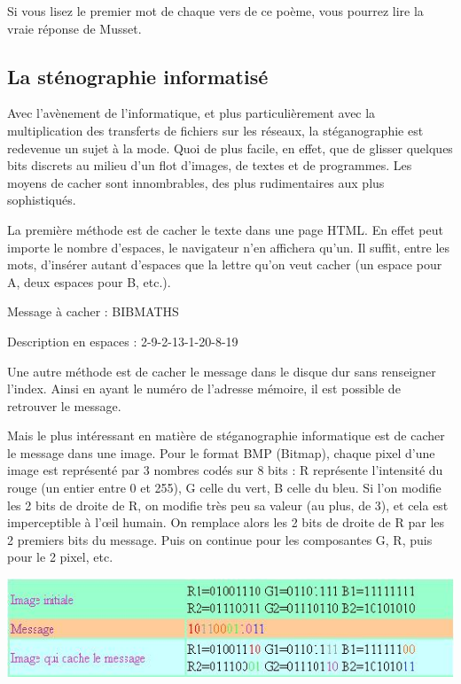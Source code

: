 \documentclass[a4paper,12pt]{article}
\begin{document}
Si vous lisez le premier mot de chaque vers de ce poème, vous pourrez lire la vraie réponse de Musset.

\subsection{La sténographie informatisé}

Avec l'avènement de l'informatique, et plus particulièrement avec la multiplication des transferts de fichiers sur les réseaux, la stéganographie est redevenue un sujet à la mode. Quoi de plus facile, en effet, que de glisser quelques bits discrets au milieu d'un flot d'images, de textes et de programmes. Les moyens de cacher sont innombrables, des plus rudimentaires aux plus sophistiqués.

La première méthode est de cacher le texte dans une page HTML. En effet peut importe le nombre d'espaces, le navigateur n'en affichera qu'un. Il suffit, entre les mots, d'insérer autant d'espaces que la lettre qu'on veut cacher (un espace pour A, deux espaces pour B, etc.).

Message à cacher : BIBMATHS

Description en espaces : 2-9-2-13-1-20-8-19

Une autre méthode est de cacher le message dans le disque dur sans renseigner l'index. Ainsi en ayant le numéro de l'adresse mémoire, il est possible de retrouver le message.

Mais le plus intéressant en matière de stéganographie informatique est de cacher le message dans une image. Pour le format BMP (Bitmap), chaque pixel d'une image est représenté par 3 nombres codés sur 8 bits : R représente l'intensité du rouge (un entier entre 0 et 255), G celle du vert, B celle du bleu. Si l'on modifie les 2 bits de droite de R, on modifie très peu sa valeur (au plus, de 3), et cela est imperceptible à l'\oe{}il humain. On remplace alors les 2 bits de droite de R par les 2 premiers bits du message. Puis on continue pour les composantes G, R, puis pour le 2\ieme{} pixel, etc.

\begin{center}
  \includegraphics[width=\textwidth]{../Image/cacher_bmp.JPG}
\end{center}
\end{document}
